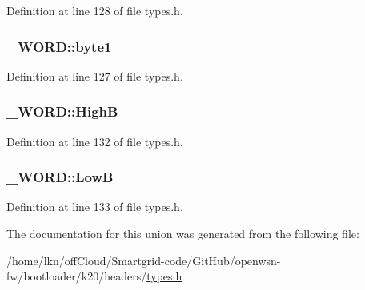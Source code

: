 Definition at line 128 of file types.\+h.

\subsubsection[{\texorpdfstring{byte1}{byte1}}]{ \+\_\+\+W\+O\+R\+D\+::byte1}\hypertarget{union___w_o_r_d_abf8dc96d722fc97a68876440d86517d5}{}\label{union___w_o_r_d_abf8dc96d722fc97a68876440d86517d5}


Definition at line 127 of file types.\+h.

\subsubsection[{\texorpdfstring{HighB}{HighB}}]{ \+\_\+\+W\+O\+R\+D\+::\+HighB}\hypertarget{union___w_o_r_d_ab08070c01735d50dd8b851bb961998f2}{}\label{union___w_o_r_d_ab08070c01735d50dd8b851bb961998f2}


Definition at line 132 of file types.\+h.

\subsubsection[{\texorpdfstring{LowB}{LowB}}]{ \+\_\+\+W\+O\+R\+D\+::\+LowB}\hypertarget{union___w_o_r_d_a654368554c33c49ef7db7134f0c8ea41}{}\label{union___w_o_r_d_a654368554c33c49ef7db7134f0c8ea41}


Definition at line 133 of file types.\+h.



The documentation for this union was generated from the following file\+:\begin{DoxyCompactItemize}
\item 
/home/lkn/off\+Cloud/\+Smartgrid-\/code/\+Git\+Hub/openwsn-\/fw/bootloader/k20/headers/\hyperlink{types_8h}{types.\+h}\end{DoxyCompactItemize}
